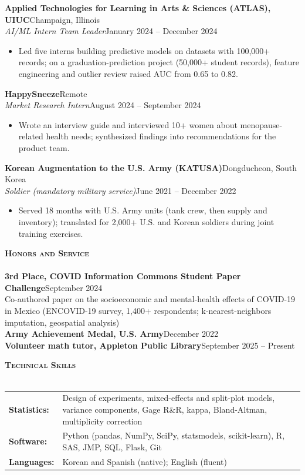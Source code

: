 \documentclass[letterpaper,10pt]{article}
\newcommand{\lineunder}{
    \vspace*{-8pt} \\
    \hspace*{-18pt} \hrulefill \\
}
\newcommand{\header}[1]{
    \Needspace{4\baselineskip}
    {\hspace*{-18pt}\vspace*{4pt} \textsc{#1}}
    \vspace*{-6pt} \lineunder
}
\newcommand{\role}[4]{
    \Needspace{5\baselineskip}
    \vspace{1pt}
    \textbf{#1}\hfill #2\\
    \textit{#3}\hfill #4\\[-3pt]
}
\begin{document}
\role{Applied Technologies for Learning in Arts \& Sciences (ATLAS), UIUC}{Champaign, Illinois}
{AI/ML Intern Team Leader}{January 2024 -- December 2024}
\begin{itemize}
  \item Led five interns building predictive models on datasets with 100,000+ records; on a graduation-prediction project (50,000+ student records), feature engineering and outlier review raised AUC from 0.65 to 0.82.
\end{itemize}

\role{HappySneeze}{Remote}
{Market Research Intern}{August 2024 -- September 2024}
\begin{itemize}
  \item Wrote an interview guide and interviewed 10+ women about menopause-related health needs; synthesized findings into recommendations for the product team.
\end{itemize}

\role{Korean Augmentation to the U.S. Army (KATUSA)}{Dongducheon, South Korea}
{Soldier (mandatory military service)}{June 2021 -- December 2022}
\begin{itemize}
  \item Served 18 months with U.S. Army units (tank crew, then supply and inventory); translated for 2,000+ U.S. and Korean soldiers during joint training exercises.
\end{itemize}

\vspace*{1mm}
\header{\textbf{Honors and Service}}
\textbf{3rd Place, COVID Information Commons Student Paper Challenge}\hfill September 2024\\[-1pt]
Co-authored paper on the socioeconomic and mental-health effects of COVID-19 in Mexico (ENCOVID-19 survey, 1,400+ respondents; k-nearest-neighbors imputation, geospatial analysis)\\[-1pt]
\textbf{Army Achievement Medal, U.S. Army}\hfill December 2022\\[-1pt]
\textbf{Volunteer math tutor, Appleton Public Library}\hfill September 2025 -- Present

\vspace*{1mm}
\header{\textbf{Technical Skills}}
\begin{tabular}{@{}l >{\raggedright\arraybackslash}p{}@{}}
\textbf{Statistics:} & Design of experiments, mixed-effects and split-plot models, variance components, Gage R\&R, kappa, Bland-Altman, multiplicity correction\\
\textbf{Software:} & Python (pandas, NumPy, SciPy, statsmodels, scikit-learn), R, SAS, JMP, SQL, Flask, Git\\
\textbf{Languages:} & Korean and Spanish (native); English (fluent)
\end{tabular}
\end{document}
